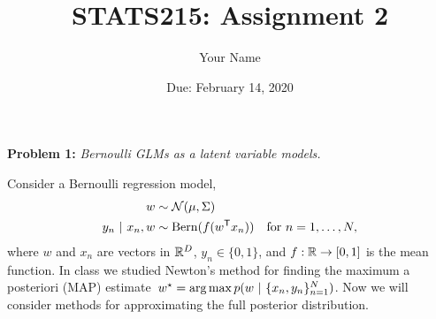 \documentclass[11pt]{article}
\title{STATS215: Assignment 2}
\author{Your Name}
\date{Due: February 14, 2020}
\begin{document}
\maketitle

\textbf{Problem 1:} \textit{Bernoulli GLMs as a latent variable models.}

Consider a Bernoulli regression model,
\begin{align*}
    w &\sim \mathcal{N}(\mu, \Sigma) \\
    y_n ~\vert~ x_n, w &\sim \mathrm{Bern}(f(w^{\mathsf{T}} x_n)) \quad \text{for } n = 1,\ldots, N,
\end{align*}
where $w$ and $x_n$ are vectors in $\mathbb{R}^D$, $y_n \in \{0, 1\}$, and $f: \mathbb{R} \to [0, 1]$ is the mean function. In class we studied Newton's method for finding the maximum a posteriori (MAP) estimate~$w^\star = \operatorname*{arg\,max} p(w ~\vert~ \{x_n, y_n\}_{n=1}^N)$.  Now we will consider methods for approximating the full posterior distribution.
\end{document}
